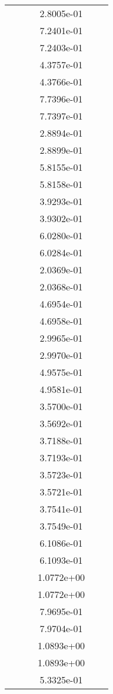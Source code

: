 \begin{xltabular}{\textwidth}{r|rS[table-format=1.3e+2]S[table-format=1.4e+2]S[table-format=1.4e+2]S[table-format=-1.5]}
&  &  & 2.8005e-01 & & \\
&  &  & 7.2401e-01 & & \\
&  &  & 7.2403e-01 & & \\
&  &  & 4.3757e-01 & & \\
&  &  & 4.3766e-01 & & \\
&  &  & 7.7396e-01 & & \\
&  &  & 7.7397e-01 & & \\
&  &  & 2.8894e-01 & & \\
&  &  & 2.8899e-01 & & \\
&  &  & 5.8155e-01 & & \\
&  &  & 5.8158e-01 & & \\
&  &  & 3.9293e-01 & & \\
&  &  & 3.9302e-01 & & \\
&  &  & 6.0280e-01 & & \\
&  &  & 6.0284e-01 & & \\
&  &  & 2.0369e-01 & & \\
&  &  & 2.0368e-01 & & \\
&  &  & 4.6954e-01 & & \\
&  &  & 4.6958e-01 & & \\
&  &  & 2.9965e-01 & & \\
&  &  & 2.9970e-01 & & \\
&  &  & 4.9575e-01 & & \\
&  &  & 4.9581e-01 & & \\
&  &  & 3.5700e-01 & & \\
&  &  & 3.5692e-01 & & \\
&  &  & 3.7188e-01 & & \\
&  &  & 3.7193e-01 & & \\
&  &  & 3.5723e-01 & & \\
&  &  & 3.5721e-01 & & \\
&  &  & 3.7541e-01 & & \\
&  &  & 3.7549e-01 & & \\
&  &  & 6.1086e-01 & & \\
&  &  & 6.1093e-01 & & \\
&  &  & 1.0772e+00 & & \\
&  &  & 1.0772e+00 & & \\
&  &  & 7.9695e-01 & & \\
&  &  & 7.9704e-01 & & \\
&  &  & 1.0893e+00 & & \\
&  &  & 1.0893e+00 & & \\
&  &  & 5.3325e-01 & & \\

\end{xltabular}
